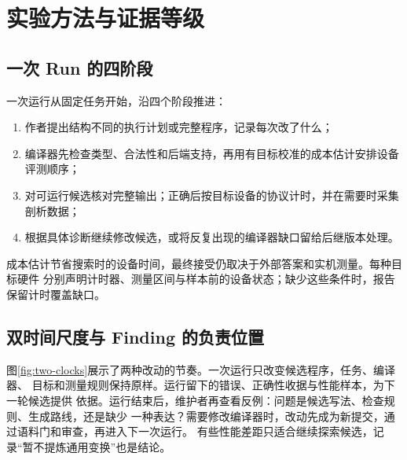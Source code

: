 \documentclass[UTF8,11pt,a4paper,fontset=none]{ctexart}
\begin{document}
\section{实验方法与证据等级}

\subsection{一次 Run 的四阶段}
一次运行从固定任务开始，沿四个阶段推进：
\begin{enumerate}
\item 作者提出结构不同的执行计划或完整程序，记录每次改了什么；
\item 编译器先检查类型、合法性和后端支持，再用有目标校准的成本估计安排设备评测顺序；
\item 对可运行候选核对完整输出；正确后按目标设备的协议计时，并在需要时采集剖析数据；
\item 根据具体诊断继续修改候选，或将反复出现的编译器缺口留给后继版本处理。
\end{enumerate}
成本估计节省搜索时的设备时间，最终接受仍取决于外部答案和实机测量。每种目标硬件
分别声明计时器、测量区间与样本前的设备状态；缺少这些条件时，报告保留计时覆盖缺口。

\subsection{双时间尺度与 Finding 的负责位置}
图\ref{fig:two-clocks}展示了两种改动的节奏。一次运行只改变候选程序，任务、编译器、
目标和测量规则保持原样。运行留下的错误、正确性收据与性能样本，为下一轮候选提供
依据。运行结束后，维护者再查看反例：问题是候选写法、检查规则、生成路线，还是缺少
一种表达？需要修改编译器时，改动先成为新提交，通过语料门和审查，再进入下一次运行。
有些性能差距只适合继续探索候选，记录“暂不提炼通用变换”也是结论。
\end{document}
